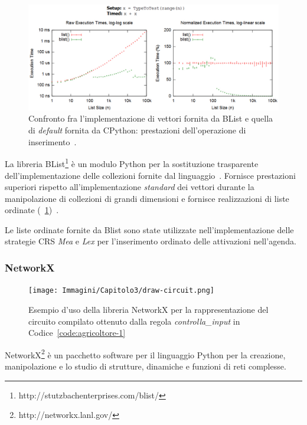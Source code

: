 \begin{figure}[h]
\centering
\includegraphics[width=1\textwidth]{Immagini/Capitolo3/BList-comparison.pdf}
\caption[Confronto fra l'implementazione di vettori fornita da BList e di \emph{default}]{Confronto fra l'implementazione di vettori fornita da BList e quella di \emph{default} fornita da CPython: prestazioni dell'operazione di inserimento~\cite{blist-prest}.}\label{fig:blist-comparison}
\end{figure}

La libreria BList\footnote{http://stutzbachenterprises.com/blist/} è un modulo Python per la sostituzione trasparente dell'implementazione delle collezioni fornite dal linguaggio~\cite{blist-manual}. Fornisce prestazioni superiori rispetto all'implementazione \emph{standard} dei vettori durante la manipolazione di collezioni di grandi dimensioni e fornisce realizzazioni di liste ordinate (\figurename~\ref{fig:blist-comparison})~\cite{blist-prest}.

Le liste ordinate fornite da Blist sono state utilizzate nell'implementazione delle strategie CRS \emph{Mea} e \emph{Lex} per l'inserimento ordinato delle attivazioni nell'agenda.


\subsubsection{NetworkX}

\begin{figure}
\centering
\texttt{[image: Immagini/Capitolo3/draw-circuit.png]}
\caption[Esempio d'uso della libreria NetworkX]{Esempio d'uso della libreria NetworkX per la rappresentazione del circuito compilato ottenuto dalla regola \emph{controlla\_input} in Codice~\ref{code:agricoltore-1}}\label{fig:networkx-example}
\end{figure}

NetworkX\footnote{http://networkx.lanl.gov/} è un pacchetto software per il linguaggio Python per la creazione, manipolazione e lo studio di strutture, dinamiche e funzioni di reti complesse.

